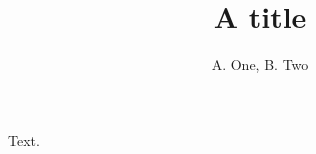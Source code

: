 \documentclass{article}
\title{A title}
\author{A. One\refaddr{la}, B. Two\refaddr{lb}}
\begin{document}
\maketitle
Text.
\end{document}
